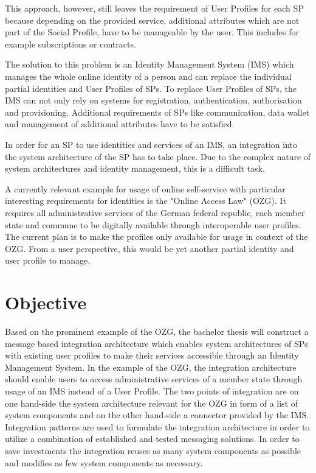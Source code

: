 \documentclass[
     12pt,         %
     a4paper,      %
     BCOR=10mm,version=first,     %
     DIV=14,version=first,        %
     ]{scrreprt}
\begin{document}
This approach, however, still leaves the requirement of User Profiles for each SP because depending on the provided service, additional attributes which are not part of the Social Profile, have to be manageable by the user. This includes for example subscriptions or contracts.

The solution to this problem is an Identity Management System (IMS) which manages the whole online identity of a person and can replace the individual partial identities and User Profiles of SPs. To replace User Profiles of SPs, the IMS can not only rely on systems for registration, authentication, authorisation and provisioning. Additional requirements of SPs like communication, data wallet and management of additional attributes have to be satisfied.

In order for an SP to use identities and services of an IMS, an integration into the system architecture of the SP has to take place. Due to the complex nature of system architectures and identity management, this is a difficult task.

A currently relevant example for usage of online self-service with particular interesting requirements for identities is the "Online Access Law" (OZG). It requires all administrative services of the German federal republic, each member state and commune to be digitally available through interoperable user profiles. The current plan is to make the profiles only available for usage in context of the OZG. From a user perspective, this would be yet another partial identity and user profile to manage.

\chapter{Objective}
Based on the prominent example of the OZG, the bachelor thesis will construct a message based integration architecture which enables system architectures of SPs with existing user profiles to make their services accessible through an Identity Management System. In the example of the OZG, the integration architecture should enable users to access administrative services of a member state through usage of an IMS instead of a User Profile. The two points of integration are on one hand-side the system architecture relevant for the OZG in form of a list of system components and on the other hand-side a connector provided by the IMS. Integration patterns are used to formulate the integration architecture in order to utilize a combination of established and tested messaging solutions. In order to save investments the integration reuses as many system components as possible and modifies as few system components as necessary.
\end{document}
